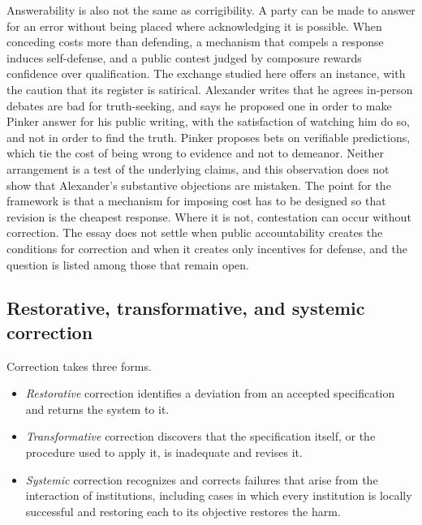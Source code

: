 \documentclass[11pt]{article}
\begin{document}
Answerability is also not the same as corrigibility. A party can be made to answer for an error without being placed where acknowledging it is possible. When conceding costs more than defending, a mechanism that compels a response induces self-defense, and a public contest judged by composure rewards confidence over qualification. The exchange studied here offers an instance, with the caution that its register is satirical. Alexander writes that he agrees in-person debates are bad for truth-seeking, and says he proposed one in order to make Pinker answer for his public writing, with the satisfaction of watching him do so, and not in order to find the truth. Pinker proposes bets on verifiable predictions, which tie the cost of being wrong to evidence and not to demeanor. Neither arrangement is a test of the underlying claims, and this observation does not show that Alexander's substantive objections are mistaken. The point for the framework is that a mechanism for imposing cost has to be designed so that revision is the cheapest response. Where it is not, contestation can occur without correction. The essay does not settle when public accountability creates the conditions for correction and when it creates only incentives for defense, and the question is listed among those that remain open.

\subsection{Restorative, transformative, and systemic correction}\label{sec:forms}

Correction takes three forms.
\begin{itemize}
\item \emph{Restorative} correction identifies a deviation from an accepted specification and returns the system to it.
\item \emph{Transformative} correction discovers that the specification itself, or the procedure used to apply it, is inadequate and revises it.
\item \emph{Systemic} correction recognizes and corrects failures that arise from the interaction of institutions, including cases in which every institution is locally successful and restoring each to its objective restores the harm.
\end{itemize}
\end{document}
